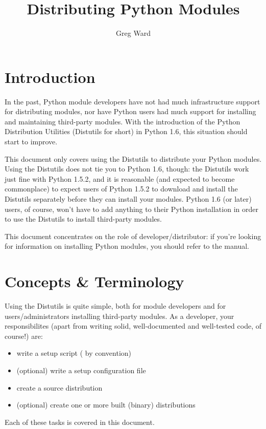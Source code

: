 \documentclass{howto}
\title{Distributing Python Modules}
\author{Greg Ward}
\begin{document}
\maketitle
\tableofcontents

\section{Introduction}
\label{intro}

In the past, Python module developers have not had much infrastructure
support for distributing modules, nor have Python users had much support
for installing and maintaining third-party modules.  With the
introduction of the Python Distribution Utilities (Distutils for short)
in Python 1.6, this situation should start to improve.

This document only covers using the Distutils to distribute your Python
modules.  Using the Distutils does not tie you to Python 1.6, though:
the Distutils work just fine with Python 1.5.2, and it is reasonable
(and expected to become commonplace) to expect users of Python 1.5.2 to
download and install the Distutils separately before they can install
your modules.  Python 1.6 (or later) users, of course, won't have to add
anything to their Python installation in order to use the Distutils to
install third-party modules.

This document concentrates on the role of developer/distributor: if
you're looking for information on installing Python modules, you
should refer to the  manual.


\section{Concepts \& Terminology}
\label{concepts}

Using the Distutils is quite simple, both for module developers and for
users/administrators installing third-party modules.  As a developer,
your responsibilites (apart from writing solid, well-documented and
well-tested code, of course!) are:
\begin{itemize}
\item write a setup script ( by convention)
\item (optional) write a setup configuration file
\item create a source distribution
\item (optional) create one or more built (binary) distributions
\end{itemize}
Each of these tasks is covered in this document.
\end{document}
